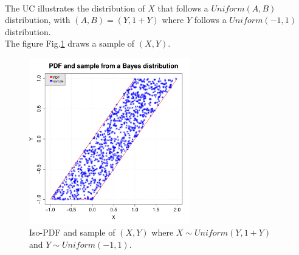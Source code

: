
\textspace\\

The UC illustrates the distribution of  $X$ that follows a $Uniform(A,B)$ distribution, with $(A,B)=(Y, 1+Y)$ where $Y$ follows a $Uniform(-1, 1)$ distribution.\\
The figure Fig.\ref{BayesPDF} draws a sample of $(X, Y)$.


\begin{figure}[H]
  \begin{center}
    \includegraphics[width=7cm]{Figures/pdf_bayesianDist.pdf}
    \caption{Iso-PDF and sample of $(X, Y)$ where $X \sim Uniform(Y, 1+Y)$ and $Y \sim Uniform(-1,1)$.}
    \label{BayesPDF}
  \end{center}
\end{figure}
